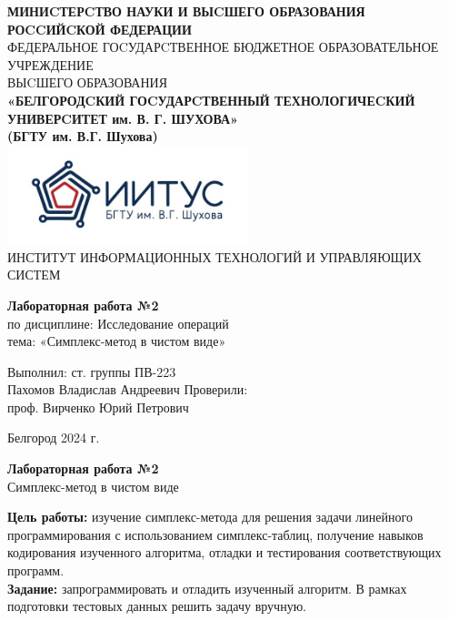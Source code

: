 \documentclass[a4paper,14pt]{extarticle}
\newcommand\textbox[1]{
	\parbox{.45\textwidth}{#1}
}
\begin{document}
\begin{center}
    \small{
        \textbf{МИНИCТЕРCТВО НАУКИ И ВЫCШЕГО ОБРАЗОВАНИЯ РОCCИЙCКОЙ ФЕДЕРАЦИИ}\\
        ФЕДЕРАЛЬНОЕ ГОCУДАРCТВЕННОЕ БЮДЖЕТНОЕ ОБРАЗОВАТЕЛЬНОЕ УЧРЕЖДЕНИЕ\\ВЫCШЕГО ОБРАЗОВАНИЯ \\
        \textbf{«БЕЛГОРОДCКИЙ ГОCУДАРCТВЕННЫЙ ТЕХНОЛОГИЧЕCКИЙ\\УНИВЕРCИТЕТ им. В. Г. ШУХОВА»\\ (БГТУ им. В.Г. Шухова)} \\
        \bigbreak
        \includegraphics[width=70mm]{log}\\
        ИНСТИТУТ ИНФОРМАЦИОННЫХ ТЕХНОЛОГИЙ И УПРАВЛЯЮЩИХ СИСТЕМ\\}
\end{center}

\vfill
\begin{center}
    \large{
        \textbf{
            Лабораторная работа №2}}\\
    \normalsize{
        по дисциплине: Исследование операций \\
        тема: «Симплекс-метод в чистом виде»}
\end{center}
\vfill
\hfill\textbox{
    Выполнил: ст. группы ПВ-223\\Пахомов Владислав Андреевич
    \bigbreak
    Проверили: \\проф. Вирченко Юрий Петрович
}
\vfill\begin{center}
    Белгород 2024 г.
\end{center}
\newpage
\begin{center}
    \textbf{Лабораторная работа №2}\\
    Симплекс-метод в чистом виде\\
\end{center}
\textbf{Цель работы: }изучение симплекс-метода для решения задачи
линейного программирования с использованием симплекс-таблиц,
получение навыков кодирования изученного алгоритма, отладки и
тестирования соответствующих программ.\\

\textbf{Задание: }запрограммировать и отладить изученный алгоритм. В рамках
подготовки тестовых данных решить задачу вручную.
\end{document}
